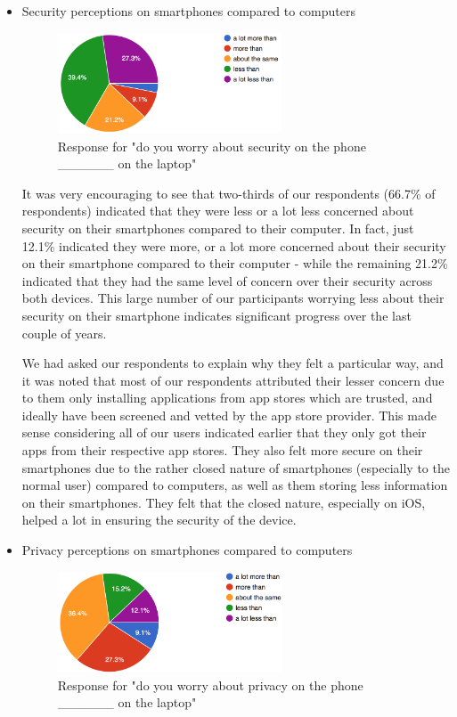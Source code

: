 \documentclass{sigchi}
\begin{document}
\begin{itemize}
\item Security perceptions on smartphones compared to computers

\begin{figure}[h]
    \includegraphics[height=3cm]{securityConfidence}
    \caption{Response for "do you worry about security on the phone \_\_\_\_\_\_  on the laptop"}
    \label{fig:securityConfidence}
\end{figure}

It was very encouraging to see that two-thirds of our respondents (66.7\% of respondents) indicated that they were less or a lot less concerned about security on their smartphones compared to their computer. In fact, just 12.1\% indicated they were more, or a lot more concerned about their security on their smartphone compared to their computer - while the remaining 21.2\% indicated that they had the same level of concern over their security across both devices. This large number of our participants worrying less about their security on their smartphone indicates significant progress over the last couple of years.

We had asked our respondents to explain why they felt a particular way, and it was noted that most of our respondents attributed their lesser concern due to them only installing applications from app stores which are trusted, and ideally have been screened and vetted by the app store provider. This made sense considering all of our users indicated earlier that they only got their apps from their respective app stores. They also felt more secure on their smartphones due to the rather closed nature of smartphones (especially to the normal user) compared to computers, as well as them storing less information on their smartphones. They felt that the closed nature, especially on iOS, helped a lot in ensuring the security of the device.

\item Privacy perceptions on smartphones compared to computers
\begin{figure}[h]
    \includegraphics[height=3cm]{privacyConfidence}
    \caption{Response for "do you worry about privacy on the phone \_\_\_\_\_\_  on the laptop"}
    \label{fig:privacyConfidence}
\end{figure}


\end{itemize}
\end{document}

